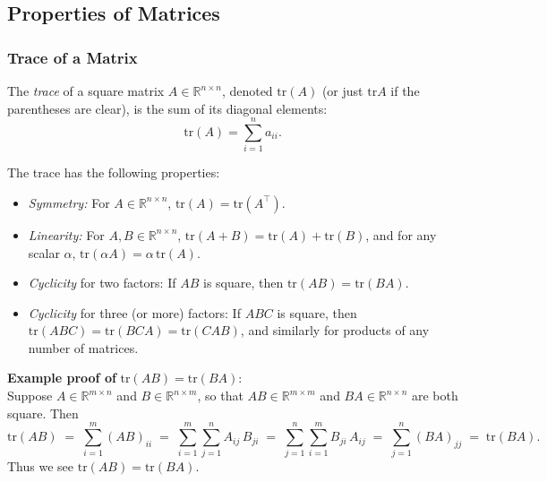 \subsection{Properties of Matrices}
\subsubsection{Trace of a Matrix}

\noindent
The \emph{trace} of a square matrix \(A \in \mathbb{R}^{n\times n}\), 
denoted \(\mathrm{tr}(A)\) (or just \(\mathrm{tr} A\) if the parentheses 
are clear), is the sum of its diagonal elements:
\[
\mathrm{tr}(A) = \sum_{i=1}^n a_{ii}.
\]

The trace has the following properties:

\begin{itemize}
    \item \textit{Symmetry:} 
          For \( A \in \mathbb{R}^{n\times n}\), 
          \(\mathrm{tr}(A) = \mathrm{tr}(A^\top)\).
    \item \textit{Linearity:} 
          For \(A, B \in \mathbb{R}^{n \times n}\),
          \(\mathrm{tr}(A + B) = \mathrm{tr}(A) + \mathrm{tr}(B)\), 
          and for any scalar \(\alpha\), 
          \(\mathrm{tr}(\alpha A) = \alpha\,\mathrm{tr}(A)\).
    \item \textit{Cyclicity} for two factors: 
          If \(AB\) is square, then 
          \(\mathrm{tr}(AB) = \mathrm{tr}(BA)\).
    \item \textit{Cyclicity} for three (or more) factors:
          If \(ABC\) is square, then 
          \(\mathrm{tr}(ABC) = \mathrm{tr}(BCA) = \mathrm{tr}(CAB)\), 
          and similarly for products of any number of matrices.
\end{itemize}

\noindent
\textbf{Example proof of} \(\mathrm{tr}(AB) = \mathrm{tr}(BA)\):\\[6pt]
Suppose \(A \in \mathbb{R}^{m \times n}\) and \(B \in \mathbb{R}^{n \times m}\), 
so that \(AB \in \mathbb{R}^{m \times m}\) and \(BA \in \mathbb{R}^{n \times n}\) 
are both square. Then
\[
\mathrm{tr}(AB)
\;=\;
\sum_{i=1}^m (AB)_{ii}
\;=\;
\sum_{i=1}^m \sum_{j=1}^n A_{ij}\,B_{ji}
\;=\;
\sum_{j=1}^n \sum_{i=1}^m B_{ji}\,A_{ij}
\;=\;
\sum_{j=1}^n (BA)_{jj}
\;=\;
\mathrm{tr}(BA).
\]
Thus we see \(\mathrm{tr}(AB) = \mathrm{tr}(BA)\).


